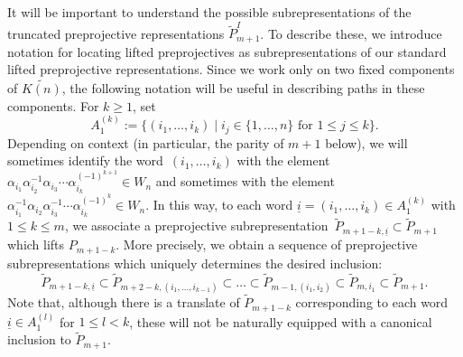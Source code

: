 \documentclass{amsart}
\numberwithin{equation}{section}
\newcommand{\ui}{{\underline i}}
\begin{document}
It will be important to understand the possible subrepresentations of the truncated preprojective representations $\tilde P_{m+1}^I$.
To describe these, we introduce notation for locating lifted preprojectives as subrepresentations of our standard lifted preprojective representations.
Since we work only on two fixed components of $\widetilde{K(n)}$, the following notation will be useful in describing paths in these components.
For $k\ge1$, set
\[A_1^{(k)}:=\{(i_1,\ldots,i_k)\mid i_j\in\{1,\ldots,n\}\text{ for $1\le j\le k$}\}.\]%
Depending on context (in particular, the parity of $m+1$ below), we will sometimes identify the word~$(i_1,\ldots,i_k)$ with the element $\alpha_{i_1}\alpha_{i_2}^{-1}\alpha_{i_3}\cdots\alpha_{i_k}^{(-1)^{k+1}}\in W_n$ and sometimes with the element $\alpha_{i_1}^{-1}\alpha_{i_2}\alpha_{i_3}^{-1}\cdots\alpha_{i_k}^{(-1)^k}\in W_n$.
In this way, to each word $\ui=(i_1,\ldots,i_k)\in A_1^{(k)}$ with $1\leq k\leq m$, we associate a preprojective subrepresentation~$\tilde P_{m+1-k,\ui}\subset\tilde P_{m+1}$ which lifts $P_{m+1-k}$.
More precisely, we obtain a sequence of preprojective subrepresentations which uniquely determines the desired inclusion:
\[\tilde P_{m+1-k,\ui}\subset\tilde P_{m+2-k,(i_1,\ldots,i_{k-1})}\subset\ldots\subset\tilde P_{m-1,(i_1,i_2)}\subset\tilde P_{m,i_1}\subset\tilde P_{m+1}.\]
Note that, although there is a translate of $\tilde P_{m+1-k}$ corresponding to each word $\ui\in A_1^{(l)}$ for $1\le l<k$, these will not be naturally equipped with a canonical inclusion to $\tilde P_{m+1}$.
\end{document}
